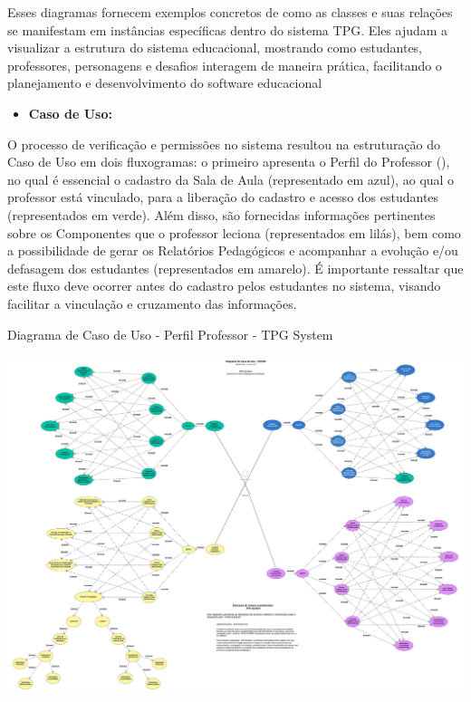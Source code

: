 Esses diagramas fornecem exemplos concretos de como as classes e suas relações se manifestam em instâncias específicas dentro do sistema TPG. Eles ajudam a visualizar a estrutura do sistema educacional, mostrando como estudantes, professores, personagens e desafios interagem de maneira prática, facilitando o planejamento e desenvolvimento do software educacional
\\

\begin{itemize}

\item \textbf{Caso de Uso:}
\\

\end{itemize}


O processo de verificação e permissões no sistema resultou na estruturação do Caso de Uso em dois fluxogramas: o primeiro apresenta o Perfil do Professor (), no qual é essencial o cadastro da Sala de Aula (representado em azul), ao qual o professor está vinculado, para a liberação do cadastro e acesso dos estudantes (representados em verde). Além disso, são fornecidas informações pertinentes sobre os Componentes que o professor leciona (representados em lilás), bem como a possibilidade de gerar os Relatórios Pedagógicos e acompanhar a evolução e/ou defasagem dos estudantes (representados em amarelo). É importante ressaltar que este fluxo deve ocorrer antes do cadastro pelos estudantes no sistema, visando facilitar a vinculação e cruzamento das informações.
\\

\begin{flowchart}[!h]
\centering
\caption{Diagrama de Caso de Uso - Perfil Professor - TPG System}%
\label{fcht:imgdgCuP.jpg}
\includegraphics[scale=0.23]{Illustrations/imgdgCuP.jpg}
\end{flowchart}

